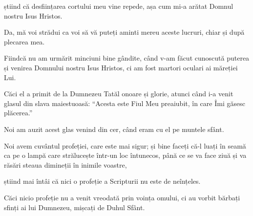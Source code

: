 {știind că desființarea cortului meu vine repede, așa cum mi-a arătat Domnul nostru Isus Hristos.

Da, mă voi strădui ca voi să vă puteți aminti mereu aceste lucruri, chiar și după plecarea mea.


\par }{\PP {}Fiindcă nu am urmărit minciuni bine gândite, când v-am făcut cunoscută puterea și venirea Domnului nostru Isus Hristos, ci am fost martori oculari ai măreției Lui.

Căci el a primit de la Dumnezeu Tatăl onoare și glorie, atunci când i-a venit glasul din slava maiestuoasă: “Acesta este Fiul Meu preaiubit, în care Îmi găsesc plăcerea.”

Noi am auzit acest glas venind din cer, când eram cu el pe muntele sfânt.


\par }{\PP {}Noi avem cuvântul profeției, care este mai sigur; și bine faceți că-l luați în seamă ca pe o lampă care strălucește într-un loc întunecos, până ce se va face ziuă și va răsări steaua dimineții în inimile voastre,

știind mai întâi că nici o profeție a Scripturii nu este de neînțeles.

Căci nicio profeție nu a venit vreodată prin voința omului, ci au vorbit bărbați sfinți ai lui Dumnezeu, mișcați de Duhul Sfânt.



\par }
